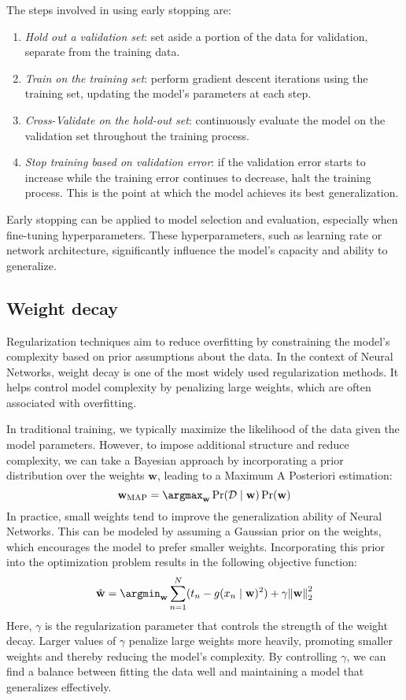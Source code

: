 \noindent The steps involved in using early stopping are:
\begin{enumerate}
    \item \textit{Hold out a validation set}: set aside a portion of the data for validation, separate from the training data. 
    \item \textit{Train on the training set}: perform gradient descent iterations using the training set, updating the model's parameters at each step.
    \item \textit{Cross-Validate on the hold-out set}: continuously evaluate the model on the validation set throughout the training process. 
    \item \textit{Stop training based on validation error}: if the validation error starts to increase while the training error continues to decrease, halt the training process. 
        This is the point at which the model achieves its best generalization.
\end{enumerate}
Early stopping can be applied to model selection and evaluation, especially when fine-tuning hyperparameters. 
These hyperparameters, such as learning rate or network architecture, significantly influence the model's capacity and ability to generalize.

\subsection{Weight decay}
Regularization techniques aim to reduce overfitting by constraining the model's complexity based on prior assumptions about the data. 
In the context of Neural Networks, weight decay is one of the most widely used regularization methods. It helps control model complexity by penalizing large weights, which are often associated with overfitting.

In traditional training, we typically maximize the likelihood of the data given the model parameters. 
However, to impose additional structure and reduce complexity, we can take a Bayesian approach by incorporating a prior distribution over the weights $\mathbf{w}$, leading to a Maximum A Posteriori estimation:
\[ \mathbf{w}_{\text{MAP}}=\argmax_{\mathbf{w}}\Pr(\mathcal{D}\mid\mathbf{w})\Pr(\mathbf{w})\]
\noindent In practice, small weights tend to improve the generalization ability of Neural Networks. 
This can be modeled by assuming a Gaussian prior on the weights, which encourages the model to prefer smaller weights. 
Incorporating this prior into the optimization problem results in the following objective function:
\[\hat{\mathbf{w}}=\argmin_{\mathbf{w}}\sum_{n=1}^N(t_n-g(x_n\mid\mathbf{w})^2)+\gamma{\left\lVert \mathbf{w}\right\rVert}_2^2 \]
\noindent Here, $\gamma$ is the regularization parameter that controls the strength of the weight decay.
Larger values of $\gamma$ penalize large weights more heavily, promoting smaller weights and thereby reducing the model's complexity.
By controlling $\gamma$, we can find a balance between fitting the data well and maintaining a model that generalizes effectively. 

